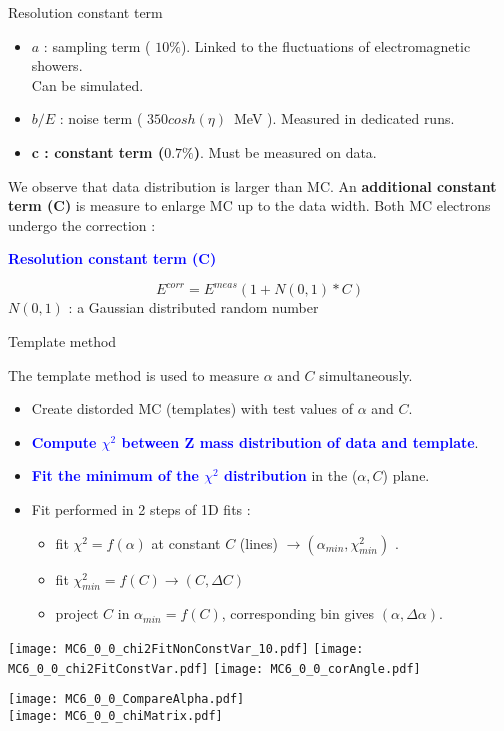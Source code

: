\documentclass[a4paper]{beamer}
\begin{document}
\begin{frame}{Resolution constant term}
  
  \begin{itemize}
  \item $a$ : sampling term ( $10\%$). Linked to the fluctuations of electromagnetic showers. \\Can be simulated.
  \item $b/E$ : noise term ( $350cosh(\eta )$~MeV ). Measured in dedicated runs.
  \item {\bf c : constant term ($0.7\%$)}. Must be measured on data.
  \end{itemize}
  We observe that data distribution is larger than MC. 
  An {\bf additional constant term (C)} is measure to enlarge MC up to the data width.
  Both MC electrons undergo the correction :
  \begin{center}\textcolor{blue}{\bf Resolution constant term (C) }\end{center}
  $$E^{corr} = E^{meas}(1+N(0,1)*C)$$
  $N(0,1)$ : a Gaussian distributed random number
\end{frame}

\begin{frame}{Template method}
\begin{minipage}{0.59\linewidth}
  The template method is used to measure $\alpha$ and $C$ simultaneously.
\begin{itemize}
\item Create distorded MC (templates) with test values of $\alpha$ and $C$.
\item \textcolor{blue}{\bf Compute $\chi^2$ between Z mass distribution of data and template}.
\item \textcolor{blue}{\bf Fit the minimum of the $\chi^2$ distribution} in the ($\alpha,C$) plane.
\item Fit performed in 2 steps of 1D fits : 
\begin{itemize}
\item fit $\chi^2=f(\alpha)$ at constant $C$ (lines) $\rightarrow (\alpha_{min}, \chi^2_{min})$ .
\item fit $\chi^2_{min}=f(C)\rightarrow (C, \Delta C)$
\item project $C$ in $\alpha_{min}=f(C)$, corresponding bin gives $(\alpha, \Delta\alpha)$.
\end{itemize}
\end{itemize}
  \texttt{[image: MC6\_0\_0\_chi2FitNonConstVar\_10.pdf]}
  \texttt{[image: MC6\_0\_0\_chi2FitConstVar.pdf]}
  \texttt{[image: MC6\_0\_0\_corAngle.pdf]}
\end{minipage}
\hfill
\begin{minipage}{0.4\linewidth}
  \texttt{[image: MC6\_0\_0\_CompareAlpha.pdf]}\\
  \texttt{[image: MC6\_0\_0\_chiMatrix.pdf]}\\
\end{minipage}
\end{frame}
\end{document}

